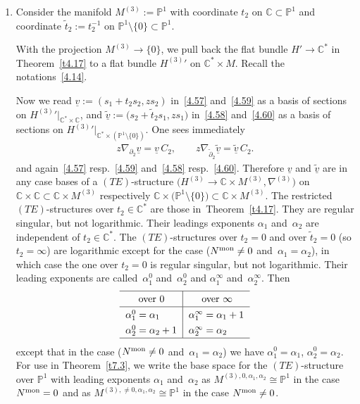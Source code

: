 \documentclass[pdftex]{sigma}%
\numberwithin{equation}{section}
\numberwithin{figure}{section}
\newcommand{\C}{{\mathbb C}}
\renewcommand{\P}{{\mathbb P}}
\newcommand{\www}{\widetilde}
\newcommand{\uuuu}{\underline}
\newcommand{\paa}{\partial}
\newcommand{\nnn}{\nabla}
\begin{document}
\begin{Remarks}\label{t7.1}\qquad

\begin{enumerate}\itemsep=0pt
\item[$(i)$] Consider the manifold $M^{(3)}:=\P^1$ with coordinate
$t_2$ on $\C\subset\P^1$ and coordinate
$\www t_2:=t_2^{-1}$ on $\P^1\setminus\{0\}\subset\P^1$.

With the projection $M^{(3)}\to\{0\}$,
we pull back the flat bundle $H'\to\C^*$ in Theorem~\ref{t4.17} to a flat bundle ${{H^{(3)}}'}$ on
$\C^*\times M$. Recall the notations~\eqref{4.14}.

Now we read $\uuuu{v}:=(s_1+t_2s_2,zs_2)$
in~\eqref{4.57} and~\eqref{4.59}
as a basis of sections on ${{H^{(3)}}'}|_{\C^*\times\C}$,
and $\uuuu{\www v}:=\big(s_2+\www t_2s_1,zs_1\big)$
in~\eqref{4.58} and~\eqref{4.60}
as a basis of sections on ${{H^{(3)}}'}|_{\C^*\times(\P^1\setminus\{0\})}$.
One sees immediately
\begin{gather}\label{7.1}
z\nnn_{\paa_2}\uuuu{v}=\uuuu{v}\, C_2,\qquad
z\nnn_{\www \paa_2}\uuuu{\www v}=\uuuu{\www v}\, C_2.
\end{gather}
and again~\eqref{4.57} resp.~\eqref{4.59}
and~\eqref{4.58} resp.~\eqref{4.60}.
Therefore $\uuuu{v}$ and $\uuuu{\www v}$ are in any case bases
of a $(TE)$-structure $\big(H^{(3)}\to\C\times M^{(3)},\nnn^{(3)}\big)$
on $\C\times \C\subset\C\times M^{(3)}$ respectively
$\C\times \big(\P^1\setminus\{0\}\big)\subset\C\times M^{(3)}$.
The restricted $(TE)$-structures over $t_2\in\C^*$ are
those in~Theo\-rem~\ref{t4.17}.
They are regular singular, but not logarithmic.
Their leadings exponents $\alpha_1$ and~$\alpha_2$ are
independent of $t_2\in\C^*$.
The $(TE)$-structures over $t_2=0$ and over $\www t_2=0$
(so $t_2=\infty$) are logarithmic except for the case
($N^{\rm mon}\neq 0$ and~$\alpha_1=\alpha_2$), in which case
the one over $t_2=0$ is regular singular, but not logarithmic.
Their leading exponents are
called~$\alpha_1^0$ and~$\alpha_2^0$ and
$\alpha_1^\infty$ and~$\alpha_2^\infty$. Then
\[
\def\arraystretch{1.3}
\begin{tabular}{l|l}
\hline
\quad\ over $0$ & \quad\ over $\infty$
\\ \hline
$\alpha_1^0=\alpha_1$ & $\alpha_1^\infty=\alpha_1+1$
\\
$\alpha_2^0=\alpha_2+1$ & $\alpha_2^\infty=\alpha_2$
\\
\hline
\end{tabular}
\]
except that in the case
($N^{\rm mon}\neq 0$ and~$\alpha_1=\alpha_2$)
we have $\alpha_1^0=\alpha_1$, $\alpha_2^0=\alpha_2$.
For use in Theorem~\ref{t7.3}, we write the base space
for the $(TE)$-structure over $\P^1$ with leading exponents
$\alpha_1$ and~$\alpha_2$ as
$M^{(3),0,\alpha_1,\alpha_2}\cong\P^1$ in the case
$N^{\rm mon}=0$ and as $M^{(3),\neq 0,\alpha_1,\alpha_2}\cong\P^1$
in the case $N^{\rm mon}\neq 0$.


\end{enumerate}
\end{Remarks}
\end{document}
